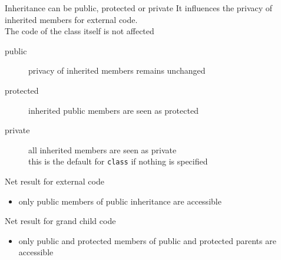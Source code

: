 \begin{frame}[fragile]
  \begin{block}{Inheritance can be public, protected or private}
    It influences the privacy of inherited members for external code.\\
    The code of the class itself is not affected
    \begin{description}
    \item[public] privacy of inherited members remains unchanged
    \item[protected] inherited public members are seen as protected
    \item[private] all inherited members are seen as private \\
      this is the default for \texttt{class} if nothing is specified
    \end{description}
  \end{block}
  \pause
  \begin{block}{Net result for external code}
    \begin{itemize}
    \item only public members of public inheritance are accessible
    \end{itemize}
  \end{block}
  \begin{block}{Net result for grand child code}
    \begin{itemize}
    \item only public and protected members of public and protected parents are accessible
    \end{itemize}
  \end{block}
\end{frame}

